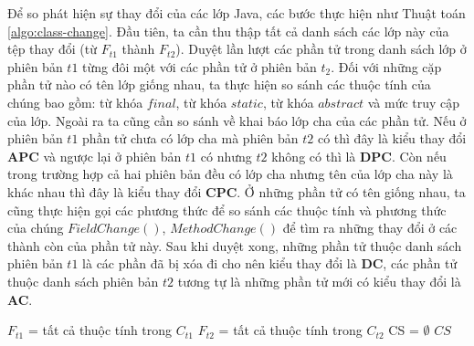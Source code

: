 \documentclass[12pt]{report}
\newenvironment{thuattoan}[1][h]
  {\renewcommand{\algorithmcfname}{Thuật toán}
   \begin{algorithm}[#1]
  }{\end{algorithm}}
\begin{document}
Để so phát hiện sự thay đổi của các lớp Java, các bước thực hiện như Thuật toán \ref{algo:class-change}. Đầu tiên, ta cần thu thập tất cả danh sách các lớp này của tệp thay đổi (từ $F_{t1}$ thành $F_{t2}$). Duyệt lần lượt các phần tử trong danh sách lớp ở phiên bản $t1$ từng đôi một với các phần tử ở phiên bản $t_2$. Đối với những cặp phần tử nào có tên lớp giống nhau, ta thực hiện so sánh các thuộc tính của chúng bao gồm: từ khóa $final$, từ khóa $static$, từ khóa $abstract$ và mức truy cập của lớp. Ngoài ra ta cũng cần so sánh về khai báo lớp cha của các phần tử. Nếu ở phiên bản $t1$ phần tử chưa có lớp cha mà phiên bản $t2$ có thì đây là kiểu thay đổi \textbf{APC} và ngược lại ở phiên bản $t1$ có nhưng $t2$ không có thì là \textbf{DPC}. Còn nếu trong trường hợp cả hai phiên bản đều có lớp cha nhưng tên của lớp cha này là khác nhau thì đây là kiểu thay đổi \textbf{CPC}. Ở những phần tử có tên giống nhau, ta cũng thực hiện gọi các phương thức để so sánh các thuộc tính và phương thức của chúng $FieldChange()$, $MethodChange()$ để tìm ra những thay đổi ở các thành còn của phần tử này. Sau khi duyệt xong, những phần tử thuộc danh sách phiên bản $t1$ là các phần đã bị xóa đi cho nên kiểu thay đổi là \textbf{DC}, các phần tử thuộc danh sách phiên bản $t2$ tương tự là những phần tử mới có kiểu thay đổi là \textbf{AC}.

\begin{thuattoan}
	\label{algo:field-change}
	\caption{$FieldChange(C_{t1}, C_{t2})$}
	
	$F_{t1}$ = tất cả thuộc tính trong $C_{t1}$\;
	$F_{t2}$ = tất cả thuộc tính trong $C_{t2}$\;
	CS = $\emptyset$\;
	\Return $CS$\;
\end{thuattoan}
\end{document}
